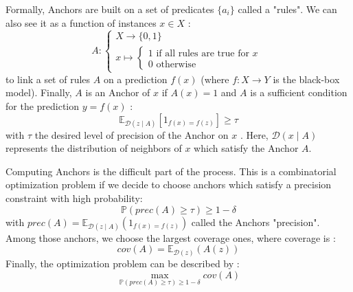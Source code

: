 \begin{definition}[Anchors]
    Formally, Anchors are built on a set of predicates $\{a_i\}$ called a "rules". We can 
    also see it as a function of instances $x \in X$ :
    $$ A : 
        \begin{cases}
            X \longrightarrow \{0, 1\} \\ 
            x \longmapsto 
            \begin{cases}
                1 \text{ if all rules are true for } x \\
                0 \text{ otherwise}
            \end{cases}
        \end{cases}
    $$
    to link a set of rules $A$ on a prediction $f(x)$ (where $f : X \longrightarrow Y$ 
    is the black-box model). Finally, $A$ is an Anchor of $x$ if $A(x) = 1$ 
    and $A$ is a sufficient condition for the prediction $y = f(x)$ :
        \begin{equation}
            \mathbb{E}_{\mathcal{D}(z \mid A)}[1_{f(x)=f(z)}] \geqslant \tau
        \end{equation}
    with $\tau$ the desired level of precision of the Anchor on $x$ \cite{ribeiro_anchors_2018}.
    Here, $ \mathcal{D}(x \mid A)$ represents the distribution of neighbors of $x$ 
    which satisfy the Anchor $A$. 
\end{definition}

Computing Anchors is the difficult part of the process. This is a combinatorial 
optimization problem if we decide to choose anchors which satisfy a precision 
constraint with high probability:
    $$	\mathbb{P} (prec(A) \geqslant \tau) \geqslant 1 - \delta$$
with $ prec(A) = \mathbb{E}_{\mathcal{D}(z \mid A)}(1_{f(x)=f(z)})$ called the Anchors 
"precision". Among those anchors, we choose the largest coverage ones, where coverage is :
\begin{equation}
    cov(A) = \mathbb{E}_{\mathcal{D}(z)} (A(z))
\end{equation}
Finally, the optimization problem can be described by :
\begin{equation}
    \max_{\mathbb{P} (prec(A) \geqslant \tau) \geqslant 1 - \delta} cov(A)
\end{equation}

